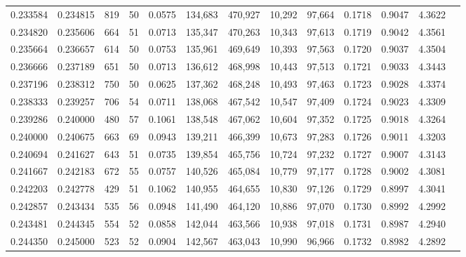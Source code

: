\begin{tabular}{rrrrrrrrrrrrr}
0.233584 & 0.234815 &    819 &    50 &                                     0.0575 & 134,683 & 470,927 &  10,292 &  97,664 & 0.1718 & 0.9047 & 4.3622 \\
0.234820 & 0.235606 &    664 &    51 &                                     0.0713 & 135,347 & 470,263 &  10,343 &  97,613 & 0.1719 & 0.9042 & 4.3561 \\
0.235664 & 0.236657 &    614 &    50 &                                     0.0753 & 135,961 & 469,649 &  10,393 &  97,563 & 0.1720 & 0.9037 & 4.3504 \\
0.236666 & 0.237189 &    651 &    50 &                                     0.0713 & 136,612 & 468,998 &  10,443 &  97,513 & 0.1721 & 0.9033 & 4.3443 \\
0.237196 & 0.238312 &    750 &    50 &                                     0.0625 & 137,362 & 468,248 &  10,493 &  97,463 & 0.1723 & 0.9028 & 4.3374 \\
0.238333 & 0.239257 &    706 &    54 &                                     0.0711 & 138,068 & 467,542 &  10,547 &  97,409 & 0.1724 & 0.9023 & 4.3309 \\
0.239286 & 0.240000 &    480 &    57 &                                     0.1061 & 138,548 & 467,062 &  10,604 &  97,352 & 0.1725 & 0.9018 & 4.3264 \\
0.240000 & 0.240675 &    663 &    69 &                                     0.0943 & 139,211 & 466,399 &  10,673 &  97,283 & 0.1726 & 0.9011 & 4.3203 \\
0.240694 & 0.241627 &    643 &    51 &                                     0.0735 & 139,854 & 465,756 &  10,724 &  97,232 & 0.1727 & 0.9007 & 4.3143 \\
0.241667 & 0.242183 &    672 &    55 &                                     0.0757 & 140,526 & 465,084 &  10,779 &  97,177 & 0.1728 & 0.9002 & 4.3081 \\
0.242203 & 0.242778 &    429 &    51 &                                     0.1062 & 140,955 & 464,655 &  10,830 &  97,126 & 0.1729 & 0.8997 & 4.3041 \\
0.242857 & 0.243434 &    535 &    56 &                                     0.0948 & 141,490 & 464,120 &  10,886 &  97,070 & 0.1730 & 0.8992 & 4.2992 \\
0.243481 & 0.244345 &    554 &    52 &                                     0.0858 & 142,044 & 463,566 &  10,938 &  97,018 & 0.1731 & 0.8987 & 4.2940 \\
0.244350 & 0.245000 &    523 &    52 &                                     0.0904 & 142,567 & 463,043 &  10,990 &  96,966 & 0.1732 & 0.8982 & 4.2892 \\

\end{tabular}
